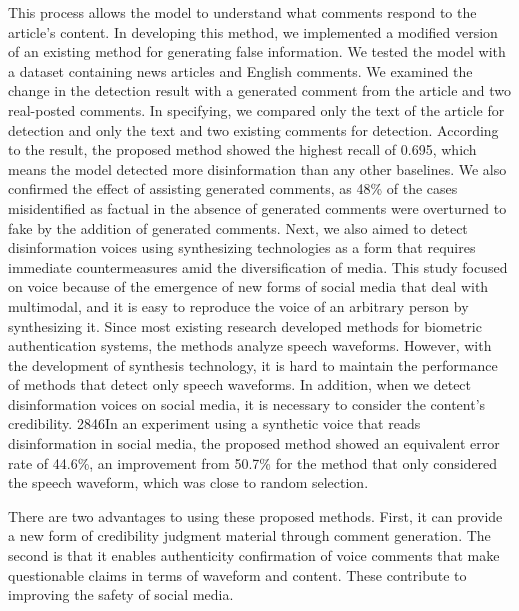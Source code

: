 This process allows the model to understand what comments respond to the article’s content.
In developing this method, we implemented a modified version of an existing method for generating false information.
We tested the model with a dataset containing news articles and English comments.
We examined the change in the detection result with a generated comment from the article and two real-posted comments.
In specifying, we compared only the text of the article for detection and only the text and two existing comments for detection.
According to the result, the proposed method showed the highest recall of 0.695,
which means the model detected more disinformation than any other baselines.
We also confirmed the effect of assisting generated comments, 
as 48\% of the cases misidentified as factual in the absence of generated comments were overturned to fake by the addition of generated comments. 
Next, we also aimed to detect disinformation voices using synthesizing technologies as a form that requires immediate countermeasures amid the diversification of media.
This study focused on voice because of the emergence of new forms of social media that deal with multimodal,
and it is easy to reproduce the voice of an arbitrary person by synthesizing it. Since most existing research developed methods for biometric authentication systems,
the methods analyze speech waveforms.
However, with the development of synthesis technology,
it is hard to maintain the performance of methods that detect only speech waveforms. 
In addition, when we detect disinformation voices on social media,
it is necessary to consider the content’s credibility.
2846In an experiment using a synthetic voice that reads disinformation in social media,
the proposed method showed an equivalent error rate of 44.6\%,
an improvement from 50.7\% for the method that only considered the speech waveform,
which was close to random selection. 

There are two advantages to using these proposed methods.
First, it can provide a new form of credibility judgment material through comment generation.
The second is that it enables authenticity confirmation of voice comments that make questionable claims in terms of waveform and content.
These contribute to improving the safety of social media. 


